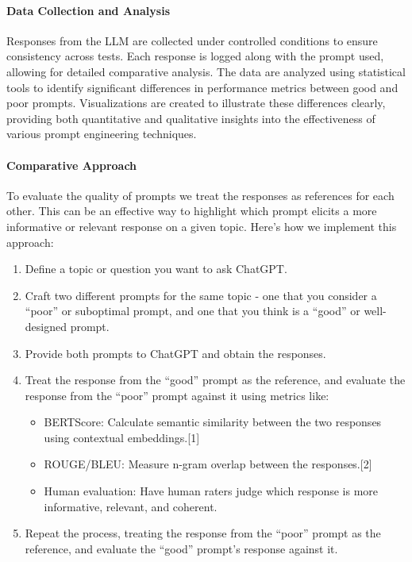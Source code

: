 \documentclass[
]{agujournal2019}
\let\oldparagraph\paragraph
\renewcommand{\paragraph}[1]{\oldparagraph{#1}\mbox{}}
\providecommand{\tightlist}{%
  \setlength{\itemsep}{0pt}\setlength{\parskip}{0pt}}\usepackage{longtable,booktabs,array}
\begin{document}
\paragraph{Data Collection and
Analysis}\label{data-collection-and-analysis}

Responses from the LLM are collected under controlled conditions to
ensure consistency across tests. Each response is logged along with the
prompt used, allowing for detailed comparative analysis. The data are
analyzed using statistical tools to identify significant differences in
performance metrics between good and poor prompts. Visualizations are
created to illustrate these differences clearly, providing both
quantitative and qualitative insights into the effectiveness of various
prompt engineering techniques.

\paragraph{Comparative Approach}\label{comparative-approach}

To evaluate the quality of prompts we treat the responses as references
for each other. This can be an effective way to highlight which prompt
elicits a more informative or relevant response on a given topic. Here's
how we implement this approach:

\begin{enumerate}
\def\labelenumi{\arabic{enumi}.}
\tightlist
\item
  Define a topic or question you want to ask ChatGPT.
\item
  Craft two different prompts for the same topic - one that you consider
  a ``poor'' or suboptimal prompt, and one that you think is a ``good''
  or well-designed prompt.
\item
  Provide both prompts to ChatGPT and obtain the responses.
\item
  Treat the response from the ``good'' prompt as the reference, and
  evaluate the response from the ``poor'' prompt against it using
  metrics like:

  \begin{itemize}
  \tightlist
  \item
    BERTScore: Calculate semantic similarity between the two responses
    using contextual embeddings.{[}1{]}
  \item
    ROUGE/BLEU: Measure n-gram overlap between the responses.{[}2{]}
  \item
    Human evaluation: Have human raters judge which response is more
    informative, relevant, and coherent.
  \end{itemize}
\item
  Repeat the process, treating the response from the ``poor'' prompt as
  the reference, and evaluate the ``good'' prompt's response against it.
\end{enumerate}
\end{document}
